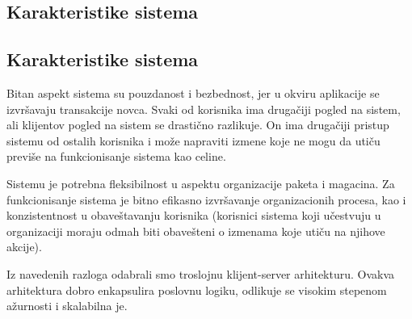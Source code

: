\subsection{Karakteristike sistema}\subsection{Karakteristike sistema}

Bitan aspekt sistema su pouzdanost i bezbednost, jer u okviru aplikacije se izvršavaju transakcije novca.
Svaki od korisnika ima drugačiji pogled na sistem, ali klijentov pogled na sistem se drastično razlikuje. On ima drugačiji pristup sistemu od ostalih korisnika i može napraviti izmene koje ne mogu da utiču previše na funkcionisanje sistema kao celine. 

Sistemu je potrebna fleksibilnost u aspektu organizacije paketa i magacina. Za funkcionisanje sistema je bitno efikasno izvršavanje organizacionih procesa, kao i konzistentnost u obaveštavanju korisnika (korisnici sistema koji učestvuju u organizaciji moraju odmah biti obavešteni o izmenama koje utiču na njihove akcije).


Iz navedenih razloga odabrali smo troslojnu klijent-server arhitekturu. Ovakva arhitektura dobro enkapsulira poslovnu logiku, odlikuje se visokim stepenom ažurnosti i skalabilna je.

